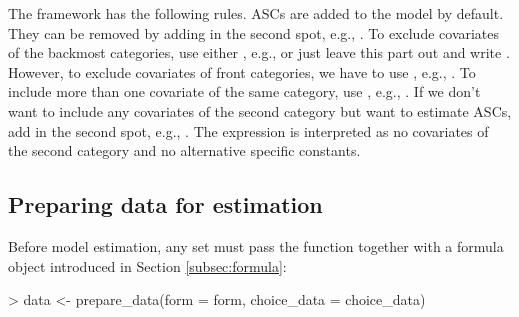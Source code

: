 \documentclass[article,shortnames]{jss}
\newcommand{\fct}[1]{\code{#1()}}
\begin{document}
The framework has the following rules. ASCs are added to the model by default. They can be removed by adding  in the second spot, e.g., . To exclude covariates of the backmost categories, use either , e.g.,  or just leave this part out and write . However, to exclude covariates of front categories, we have to use , e.g., . To include more than one covariate of the same category, use \code{+}, e.g., . If we don't want to include any covariates of the second category but want to estimate ASCs, add  in the second spot, e.g., . The expression  is interpreted as no covariates of the second category and no alternative specific constants.

\subsection{Preparing data for estimation} \label{subsec:prepare_data}

Before model estimation, any  set must pass the \fct{prepare\_data} function together with a formula object  introduced in Section \ref{subsec:formula}:

\begin{Schunk}
\begin{Sinput}
> data <- prepare_data(form = form, choice_data = choice_data)
\end{Sinput}
\end{Schunk}
\end{document}
